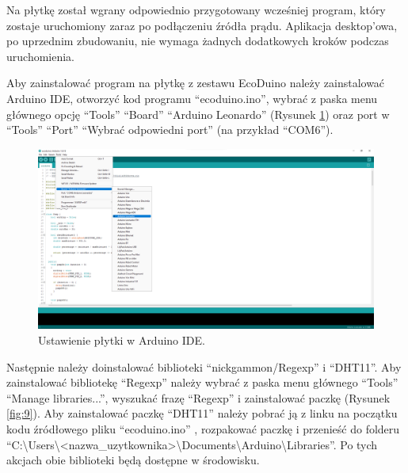 \documentclass[a4paper,twoside,12pt]{book}
\begin{document}
Na płytkę został wgrany odpowiednio przygotowany wcześniej program, który zostaje uruchomiony zaraz po podłączeniu źródła prądu. Aplikacja desktop'owa, po uprzednim zbudowaniu, nie wymaga żadnych dodatkowych kroków podczas uruchomienia.

Aby zainstalować program na płytkę z zestawu EcoDuino należy zainstalować Arduino IDE, otworzyć kod programu ``ecoduino.ino'', wybrać z paska menu głównego opcję ``Tools'' \textrightarrow  ``Board'' \textrightarrow  ``Arduino Leonardo'' (Rysunek \ref{fig:8}) oraz port w ``Tools'' \textrightarrow  ``Port'' \textrightarrow  ``Wybrać odpowiedni port'' (na przykład ``COM6'').

\begin{figure}[H]
   \centering
   \includegraphics[width=\textwidth]{./assets/img/img008.png}
   \caption{Ustawienie płytki w Arduino IDE.}
   \label{fig:8}
\end{figure}

\newpage

Następnie należy doinstalować biblioteki ``nickgammon/Regexp'' i ``DHT11''. Aby zainstalować bibliotekę ``Regexp'' należy wybrać z paska menu głównego ``Tools'' \textrightarrow  ``Manage libraries...'', wyszukać frazę ``Regexp'' i zainstalować paczkę (Rysunek \ref{fig:9}). Aby zainstalować paczkę ``DHT11'' należy pobrać ją z linku na początku kodu źródłowego pliku ``ecoduino.ino'' \cite{bib:url004}, rozpakować paczkę i przenieść do folderu ``C:\textbackslash Users\textbackslash \textless nazwa\_uzytkownika\textgreater \textbackslash Documents\textbackslash Arduino\textbackslash Libraries''. Po tych akcjach obie biblioteki będą dostępne w środowisku.
\end{document}
